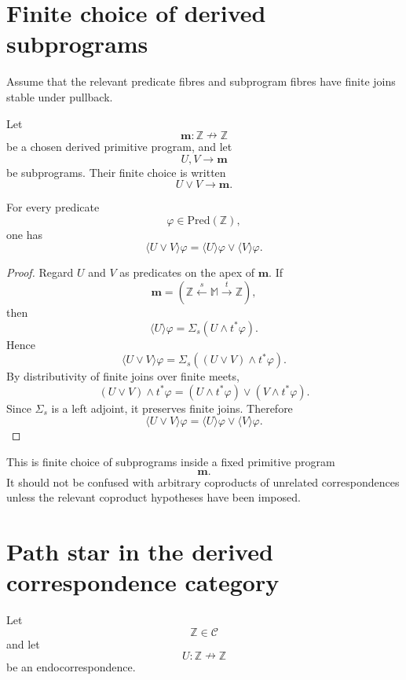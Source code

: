 \section{Finite choice of derived subprograms}
\label{sec:finite-choice-derived-subprograms}

Assume that the relevant predicate fibres and subprogram fibres have finite
joins stable under pullback.

Let
\[
\mathbf m:\mathbb Z\nrightarrow\mathbb Z
\]
be a chosen derived primitive program, and let
\[
U,V\to\mathbf m
\]
be subprograms. Their finite choice is written
\[
U\vee V\to\mathbf m.
\]

\begin{proposition}
\label{prop:derived-finite-choice-law}
For every predicate
\[
\varphi\in\mathrm{Pred}(\mathbb Z),
\]
one has
\[
\langle U\vee V\rangle\varphi
=
\langle U\rangle\varphi
\vee
\langle V\rangle\varphi.
\]
\end{proposition}

\begin{proof}
Regard \(U\) and \(V\) as predicates on the apex of \(\mathbf m\). If
\[
\mathbf m=(\mathbb Z\xleftarrow{s}\mathbb M\xrightarrow{t}\mathbb Z),
\]
then
\[
\langle U\rangle\varphi
=
\Sigma_s(U\wedge t^\ast\varphi).
\]
Hence
\[
\langle U\vee V\rangle\varphi
=
\Sigma_s((U\vee V)\wedge t^\ast\varphi).
\]
By distributivity of finite joins over finite meets,
\[
(U\vee V)\wedge t^\ast\varphi
=
(U\wedge t^\ast\varphi)
\vee
(V\wedge t^\ast\varphi).
\]
Since \(\Sigma_s\) is a left adjoint, it preserves finite joins. Therefore
\[
\langle U\vee V\rangle\varphi
=
\langle U\rangle\varphi
\vee
\langle V\rangle\varphi.
\]
\end{proof}

\begin{remark}
\label{rem:derived-choice-fixed-primitive}
This is finite choice of subprograms inside a fixed primitive program
\[
\mathbf m.
\]
It should not be confused with arbitrary coproducts of unrelated
correspondences unless the relevant coproduct hypotheses have been imposed.
\end{remark}

\section{Path star in the derived correspondence category}
\label{sec:path-star-derived-corr}

Let
\[
\mathbb Z\in\mathcal C
\]
and let
\[
U:\mathbb Z\nrightarrow\mathbb Z
\]
be an endocorrespondence.

